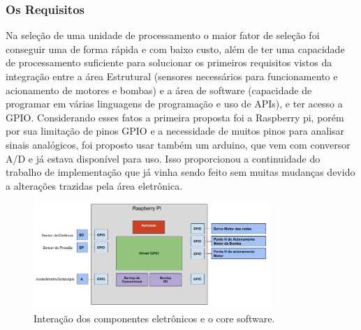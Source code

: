 \subsubsection{Os Requisitos}
Na seleção de uma unidade de processamento o maior fator de seleção foi conseguir uma de forma rápida e com baixo custo, além de ter uma capacidade de processamento suficiente para solucionar os primeiros requisitos vistos da integração entre a área Estrutural (sensores necessários para funcionamento e acionamento de motores e bombas) e a área de software (capacidade de programar em várias linguagens de programação e uso de APIs), e ter acesso a GPIO. Considerando esses fatos a primeira proposta foi a Raspberry pi, porém por sua limitação de pinos GPIO e a necessidade de muitos pinos para analisar sinais analógicos, foi proposto usar também um arduino, que vem com conversor A/D e já estava disponível para uso. Isso proporcionou a continuidade do trabalho de implementação que já vinha sendo feito sem muitas mudanças devido a alterações trazidas pela área eletrônica.
\par
\begin{figure}[h]
  \centering
  \includegraphics[width=0.8\textwidth]{figures/schema-eletro-soft.png}
  \caption{Interação dos componentes eletrônicos e o core software.}
  \label{fig:schema-eletro-soft}
\end{figure}
\FloatBarrier
\par

